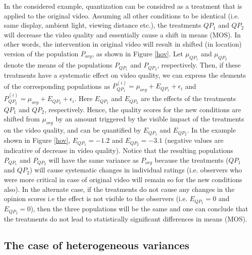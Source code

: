 \documentclass[10pt,final,Twcolumn]{IEEEtran}
\begin{document}
In the considered example, quantization can be considred as a treatment that is applied to the original video. Assuming all other conditions to be identical (i.e. same display, ambient light, viewing distance etc.), the treatments $QP_1$ and $QP_2$ will decrease the video quality and essentially cause a shift in means (MOS). In other words, the intervention in original video will result in shifted (in location) version of the population $P_{org}$, as shown in Figure \ref{hov}. Let $\mu_{QP_1}$ and $\mu_{QP_2}$ denote the means of the populations $P_{QP_1}$ and $P_{QP_2}$, respectively. Then, if these treatments have a systematic effect on video quality, we can express the elements of the corresponding populations as $P_{QP_1}^{(i)}= {\mu_{org}+E_{QP_1}+\epsilon_i}$ and $P_{QP_2}^{(i)}= {\mu_{org}+E_{QP_2}+\epsilon_i}$. Here $E_{QP_1}$ and $E_{QP_2}$ are the effects of the treatments $QP_1$ and $QP_2$, respectively. Hence, the quality scores for the new conditions are shifted from $\mu_{org}$ by an amount triggered by the visible impact of the treatments on the video quality, and can be quantified by $E_{QP_1}$ and $E_{QP_2}$. In the example shown in Figure \ref{hov}, $E_{QP_1} = -1.2$ and $E_{QP_2} = -3.1$ (negative values are indicative of decrease in video quality). Notice that the resulting populations $P_{QP_1}$ and $P_{QP_2}$ will have the same variance as $P_{org}$ because the treatments ($QP_1$ and $QP_2$) will cause systematic changes in individual ratings (i.e. observers who were more critical in case of original video will remain so for the new conditions also). In the alternate case, if the treatments do not cause any changes in the opinion scores i.e the effect is not visible to the observers (i.e. $E_{QP_1} = 0$ and $E_{QP_2} = 0$), then the three populations will be the same and one can conclude that the treatments do not lead to statistically significant differences in means (MOS). 

\subsection{The case of heterogeneous variances} \label{heterogeneous variances}
\end{document}
